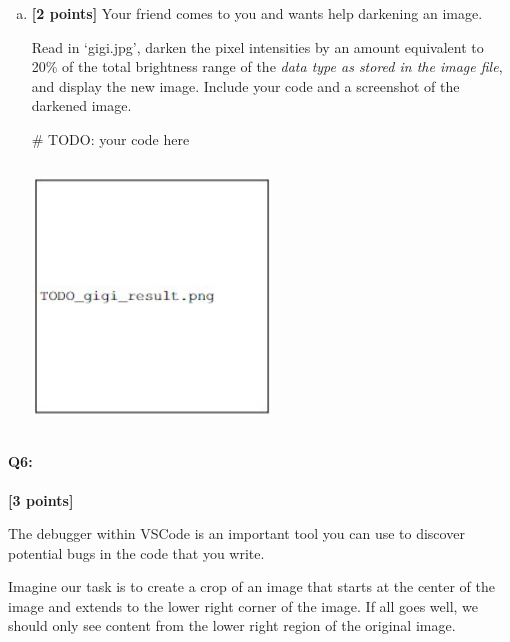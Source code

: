 \documentclass[11pt]{article}
\begin{document}
\begin{enumerate} [(a)]
\item \textbf{[2 points]} Your friend comes to you and wants help darkening an image.
\begin{tcolorbox}[colback=orange!5!white,colframe=orange!75!black]
Read in `gigi.jpg', darken the pixel intensities by an amount equivalent to 20\% of the total brightness range of the \emph{data type as stored in the image file}, and display the new image. Include your code and a screenshot of the darkened image.
\end{tcolorbox}

\begin{tcolorbox}[colback=white!5!white,colframe=green!75!black,height fill]
    \begin{python}
    # TODO: your code here
    \end{python}
    
    \includegraphics[width=0.5\textwidth,height=7cm,keepaspectratio]{images/TODO_gigi_result.jpg}
\end{tcolorbox}
\end{enumerate}



\pagebreak
\paragraph{Q6:} \textbf{[3 points]}

The debugger within VSCode is an important tool you can use to discover potential bugs in the code that you write.

Imagine our task is to create a crop of an image that starts at the center of the image and extends to the lower right corner of the image. If all goes well, we should only see content from the lower right region of the original image.
\end{document}
